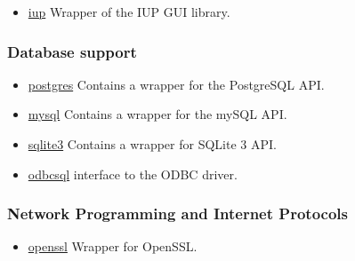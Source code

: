 \begin{itemize}
\tightlist
\item
  \href{iup.html}{iup} Wrapper of the IUP GUI library.
\end{itemize}

\hypertarget{database-support-1}{%
\subsubsection{Database support}\label{database-support-1}}

\begin{itemize}
\tightlist
\item
  \href{postgres.html}{postgres} Contains a wrapper for the PostgreSQL
  API.
\item
  \href{mysql.html}{mysql} Contains a wrapper for the mySQL API.
\item
  \href{sqlite3.html}{sqlite3} Contains a wrapper for SQLite 3 API.
\item
  \href{odbcsql.html}{odbcsql} interface to the ODBC driver.
\end{itemize}

\hypertarget{network-programming-and-internet-protocols}{%
\subsubsection{Network Programming and Internet
Protocols}\label{network-programming-and-internet-protocols}}

\begin{itemize}
\tightlist
\item
  \href{openssl.html}{openssl} Wrapper for OpenSSL.
\end{itemize}

